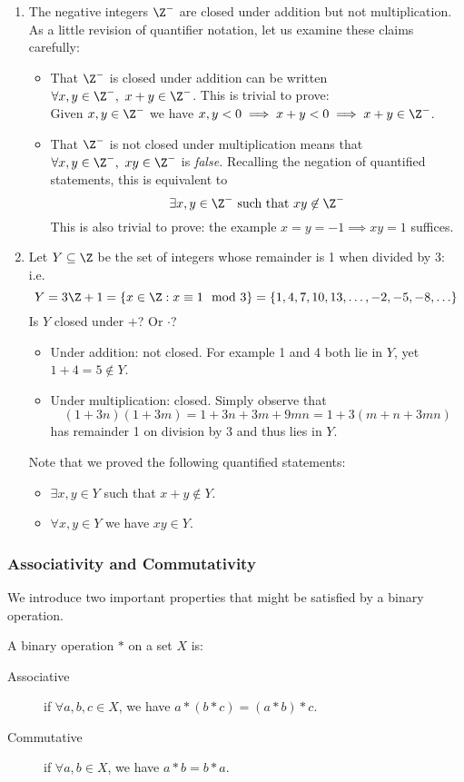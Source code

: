 \begin{enumerate}
	\item The negative integers $\Z^-$ are closed under addition but not multiplication. As a little revision of quantifier notation, let us examine these claims carefully:
	\begin{itemize}
	  \item That $\Z^-$ is closed under addition can be written $\forall x,y\in\Z^-,\ x+y\in\Z^-$. This is trivial to prove:\\
	  Given $x,y\in\Z^-$ we have $x,y<0\implies x+y<0\implies x+y\in\Z^-$.
	  \item That $\Z^-$ is not closed under multiplication means that $\forall x,y\in\Z^-,\ xy\in\Z^-$ is \emph{false.} Recalling the negation of quantified statements, this is equivalent to
	  \[\exists x,y\in\Z^-\ \text{such that}\ xy\not\in\Z^-\]
	  This is also trivial to prove: the example $x=y=-1\implies xy=1$ suffices.
	\end{itemize}
	\item\label{intro:modex} Let $Y\subseteq\Z$ be the set of integers whose remainder is 1 when divided by 3: i.e.
	\[Y=3\Z+1=\{x\in\Z:x\equiv 1\mod 3\}=\{1,4,7,10,13,\ldots, -2,-5,-8,\ldots\}\] Is $Y$ 	closed under $+$? Or $\cdot$?
	\begin{itemize}
	  \item Under addition: not closed. For example 1 and 4 both lie in $Y$, yet $1+4=5\not\in Y$.
	  \item Under multiplication: closed. Simply observe that
	  \[(1+3n)(1+3m)=1+3n+3m+9mn=1+3(m+n+3mn)\]
	  has remainder 1 on division by 3 and thus lies in $Y$.
	\end{itemize}
	Note that we proved the following quantified statements:
	\begin{itemize}
	  \item $\exists x,y\in Y$ such that $x+y\not\in Y$.
	  \item $\forall x,y\in Y$ we have $xy\in Y$.
	\end{itemize}
\end{enumerate}

\subsubsection*{Associativity and Commutativity}

We introduce two important properties that might be satisfied by a binary operation.

\begin{defn}
A binary operation $*$ on a set $X$ is:
\begin{description}
\item[Associative] if $\forall a,b,c\in X$, we have $a*(b*c)=(a*b)*c$.
\item[Commutative] if $\forall a,b\in X$, we have $a*b=b*a$.
\end{description}
\end{defn}

